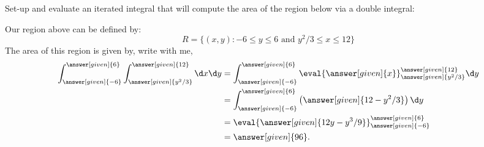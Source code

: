 \documentclass{ximera}
\begin{document}
\begin{example}
  Set-up and evaluate an iterated integral that will compute the area
  of the region below via a double integral:
  \begin{image}
  \end{image}
  \begin{explanation}
    Our region above can be defined by:
    \[
    R=\{(x,y):\text{$-6\leq y\leq 6$ and $y^2/3\leq x\leq 12$}\}
    \]
    The area of this region is given by, write with me, 
    \begin{align*}
      \int_{\answer[given]{-6}}^{\answer[given]{6}}\int_{\answer[given]{y^2/3}}^{\answer[given]{12}}\d x \d y &= \int_{\answer[given]{-6}}^{\answer[given]{6}} \eval{\answer[given]{x}}_{\answer[given]{y^2/3}}^{\answer[given]{12}} \d y\\
      &=  \int_{\answer[given]{-6}}^{\answer[given]{6}} \left(\answer[given]{12-y^2/3}\right) \d y\\
      &=  \eval{\answer[given]{12y-y^3/9}}_{\answer[given]{-6}}^{\answer[given]{6}}\\
      &= \answer[given]{96}. 
    \end{align*}
  \end{explanation}
\end{example}
\end{document}
